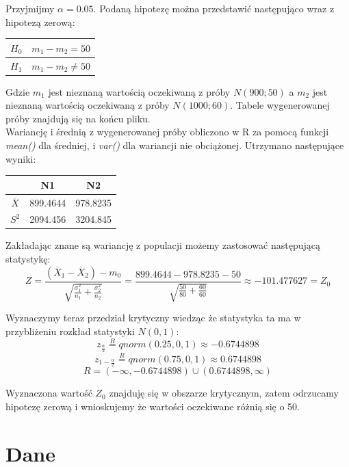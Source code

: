 \documentclass{article}
\begin{document}
Przyjmijmy $\alpha = 0.05$. Podaną hipotezę można przedstawić następująco wraz z hipotezą zerową:
\begin{center} \begin{tabular}{|c|c|} \hline
$H_0$ & $m_1 - m_2 = 50$ \\ \hline
$H_1$ & $m_1 - m_2 \neq 50$ \\ \hline
\end{tabular} \end{center}
Gdzie $m_1$ jest nieznaną wartością oczekiwaną z próby $N(900;50)$ a $m_2$ jest nieznaną wartością oczekiwaną z próby  $N(1000;60)$. Tabele wygenerowanej próby znajdują się na końcu pliku. \\
Wariancję i średnią z wygenerowanej próby obliczono w R za pomocą funkcji \textit{mean()} dla średniej, i \textit{var()} dla wariancji nie  obciążonej. Utrzymano następujące wyniki:
\begin{center} \begin{tabular}{|c|c|c|} \hline
& N1 & N2 \\ \hline
$\overline{X}$ & 899.4644 & 978.8235 \\ \hline
$S^2$ & 2094.456 & 3204.845 \\ \hline
\end{tabular} \end{center}

Zakładając znane są wariancję z populacji możemy zastosować następującą statystykę:
\[Z = \frac{(\overline{X}_1 - \overline{X}_2) - m_0}{\sqrt{ \frac{\sigma_1^2}{n_1} + \frac{\sigma_2^2}{n_2} }} = \frac{899.4644 - 978.8235 - 50}{\sqrt{\frac{50}{80} + \frac{60}{60} }} \approx -101.477627 = Z_0\]

Wyznaczymy teraz przedział krytyczny wiedząc że statystyka ta ma w przybliżeniu rozkład statystyki $N(0,1)$:
\[ z_{\frac{\alpha}{2}} \overset{R}{=} qnorm(0.25, 0, 1) \approx -0.6744898 \]
\[ z_{1 - \frac{\alpha}{2}} \overset{R}{=} qnorm(0.75, 0, 1) \approx 0.6744898 \]
\[ R = (-\infty, -0.6744898) \cup (0.6744898, \infty) \]

Wyznaczona wartość $Z_0$ znajduję się w obszarze krytycznym, zatem odrzucamy hipotezę zerową i wnioskujemy że wartości oczekiwane różnią się o 50.

\newpage
\section{Dane}
\begin{center}
\tiny
{}
\end{center}
\end{document}
